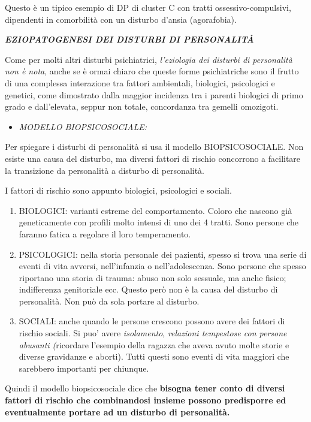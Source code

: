 \documentclass[]{article}
\begin{document}
Questo è un tipico esempio di DP di cluster C con tratti
ossessivo-compulsivi, dipendenti in comorbilità con un disturbo d'ansia
(agorafobia).

\textbf{\emph{EZIOPATOGENESI DEI DISTURBI DI PERSONALITÀ}}

Come per molti altri disturbi psichiatrici, \emph{l'eziologia dei
disturbi di personalità non è nota}, anche se è ormai chiaro che queste
forme psichiatriche sono il frutto di una complessa interazione tra
fattori ambientali, biologici, psicologici e genetici, come dimostrato
dalla maggior incidenza tra i parenti biologici di primo grado e
dall'elevata, seppur non totale, concordanza tra gemelli omozigoti.

\begin{itemize}
\item
  \emph{MODELLO BIOPSICOSOCIALE:}
\end{itemize}

Per spiegare i disturbi di personalità si usa il modello
BIOPSICOSOCIALE. Non esiste una causa del disturbo, ma diversi fattori
di rischio concorrono a facilitare la transizione da personalità a
disturbo di personalità.

I fattori di rischio sono appunto biologici, psicologici e sociali.

\begin{enumerate}
\def\labelenumi{\arabic{enumi}.}
\item
  BIOLOGICI: varianti estreme del comportamento. Coloro che nascono già
  geneticamente con profili molto intensi di uno dei 4 tratti. Sono
  persone che faranno fatica a regolare il loro temperamento.
\item
  PSICOLOGICI: nella storia personale dei pazienti, spesso si trova una
  serie di eventi di vita avversi, nell'infanzia o nell'adolescenza.
  Sono persone che spesso riportano una storia di trauma: abuso non solo
  sessuale, ma anche fisico; indifferenza genitoriale ecc. Questo però
  non è la causa del disturbo di personalità. Non può da sola portare al
  disturbo.
\item
  SOCIALI: anche quando le persone crescono possono avere dei fattori di
  rischio sociali. Si puo' avere \emph{isolamento}, \emph{relazioni
  tempestose con persone abusanti (}ricordare l'esempio della ragazza
  che aveva avuto molte storie e diverse gravidanze e aborti). Tutti
  questi sono eventi di vita maggiori che sarebbero importanti per
  chiunque.
\end{enumerate}

Quindi il modello biopsicosociale dice che \textbf{bisogna tener conto
di diversi fattori di rischio che combinandosi insieme possono
predisporre ed eventualmente portare ad un disturbo di personalità.}
\end{document}
